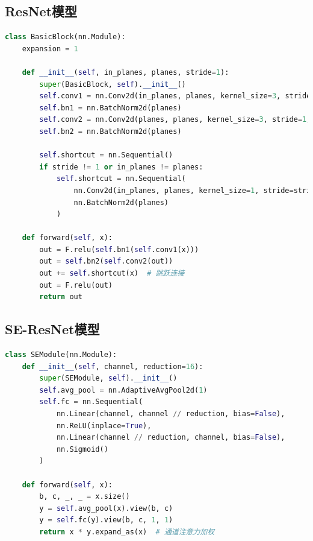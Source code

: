 \documentclass[12pt,a4paper]{article}
\begin{document}
\subsection{ResNet模型}
\begin{lstlisting}[language=Python, caption=ResNet18模型结构]
class BasicBlock(nn.Module):
    expansion = 1
    
    def __init__(self, in_planes, planes, stride=1):
        super(BasicBlock, self).__init__()
        self.conv1 = nn.Conv2d(in_planes, planes, kernel_size=3, stride=stride, padding=1, bias=False)
        self.bn1 = nn.BatchNorm2d(planes)
        self.conv2 = nn.Conv2d(planes, planes, kernel_size=3, stride=1, padding=1, bias=False)
        self.bn2 = nn.BatchNorm2d(planes)
        
        self.shortcut = nn.Sequential()
        if stride != 1 or in_planes != planes:
            self.shortcut = nn.Sequential(
                nn.Conv2d(in_planes, planes, kernel_size=1, stride=stride, bias=False),
                nn.BatchNorm2d(planes)
            )
    
    def forward(self, x):
        out = F.relu(self.bn1(self.conv1(x)))
        out = self.bn2(self.conv2(out))
        out += self.shortcut(x)  # 跳跃连接
        out = F.relu(out)
        return out
\end{lstlisting}

\subsection{SE-ResNet模型}
\begin{lstlisting}[language=Python, caption=SE模块结构]
class SEModule(nn.Module):
    def __init__(self, channel, reduction=16):
        super(SEModule, self).__init__()
        self.avg_pool = nn.AdaptiveAvgPool2d(1)
        self.fc = nn.Sequential(
            nn.Linear(channel, channel // reduction, bias=False),
            nn.ReLU(inplace=True),
            nn.Linear(channel // reduction, channel, bias=False),
            nn.Sigmoid()
        )

    def forward(self, x):
        b, c, _, _ = x.size()
        y = self.avg_pool(x).view(b, c)
        y = self.fc(y).view(b, c, 1, 1)
        return x * y.expand_as(x)  # 通道注意力加权
\end{lstlisting}
\end{document}
